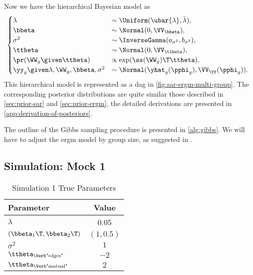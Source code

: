 Now we have the hierarchical Bayesian model as
\begin{align*}
	\begin{cases}
		\lambda                   &\sim \Uniform(\ubar{\lambda},\bar{\lambda}), \\
		\bbeta                    &\sim \Normal(0,\VV_{\bbeta}), \\
		\sigma^2                  &\sim \InverseGamma(a_{\sigma^2},b_{\sigma^2}), \\
		\ttheta                   &\sim \Normal(0,\VV_{\ttheta}), \\
		\pr(\WW_{g}\given\ttheta) &\propto \exp(\ss(\WW_{g})\T\ttheta), \\
		\yy_{g}\given\lambda,\WW_{g},\bbeta,\sigma^2 &\sim \Normal(\yhat_{g}(\pphi_{g}),\VV_{\yy}(\pphi_{g})).
	\end{cases}
\end{align*}
This hierarchical model is represented as a \acrshort{dag} in \autoref{fig:sar-ergm-multi-group}.
The corresponding posterior distributions are quite similar those described in \autoref{sec:prior-sar} and \autoref{sec:prior-ergm},
the detailed derivations are presented in \autoref{app:derivation-of-posteriors}.

The outline of the Gibbs sampling procedure is presented in \autoref{alg:gibbs}.
We will have to adjust the \acrshort{ergm} model by group size, as suggested in \cite{krivitsky-handcock-morris-2011}.

\subsection{Simulation: Mock 1}

\begin{table}[t]
	\centering
	\begin{tabular}{l|c}
		\toprule
		Parameter & Value \\
		\midrule
		$\lambda$ & 0.05 \\
		$(\bbeta_1\T,\bbeta_2\T)$ & $(1,0.5)$ \\
		$\sigma^2$ & $1$ \\
		$\ttheta_{\text{\Verb"edges"}}$  & $-2$ \\
		$\ttheta_{\text{\Verb"mutual"}}$ & $2$ \\
		\bottomrule
	\end{tabular}
	\caption{Simulation 1 True Parameters}
	\label{tab:simulation-1-params}
\end{table}

